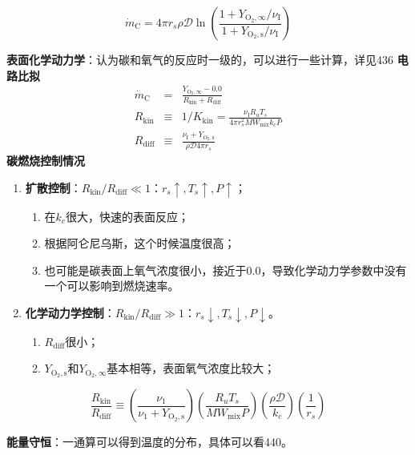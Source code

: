 \begin{equation}
    \dot{m}_\mathrm{C} = 4\pi r_s \rho \mathcal{D} \ln\left(\frac{1+Y_\mathrm{O_2,\infty}/\nu_\mathrm{I}}{1+Y_\mathrm{O_2,s}/\nu_\mathrm{I}}\right)
\end{equation}

\textbf{表面化学动力学}：认为碳和氧气的反应时一级的，可以进行一些计算，详见436
\textbf{电路比拟}
\begin{eqnarray}
    \dot{m}_\mathrm{C} &=& \frac{Y_\mathrm{O_2,\infty}-0.0}{R_\mathrm{kin}+R_\mathrm{diff}}\\
    R_\mathrm{kin} &\equiv& 1/K_\mathrm{kin} = \frac{\nu_\mathrm{I}R_u T_s}{4\pi r_s^2 MW_\mathrm{mix}k_c P}\\
    R_\mathrm{diff} &\equiv& \frac{\nu_\mathrm{I}+Y_\mathrm{O_2, s}}{\rho \mathcal{D}4\pi r_s}
\end{eqnarray}
\textbf{碳燃烧控制情况}

\begin{enumerate}
    \item \textbf{扩散控制}：\(R_\mathrm{kin}/R_\mathrm{diff}\ll1\)：\(r_s\uparrow, T_s\uparrow, P\uparrow\)；
    \begin{enumerate}
        \item 在\(k_c\)很大，快速的表面反应；
        \item 根据阿仑尼乌斯，这个时候温度很高；
        \item 也可能是碳表面上氧气浓度很小，接近于0.0，导致化学动力学参数中没有一个可以影响到燃烧速率。
    \end{enumerate}
    \item \textbf{化学动力学控制}：\(R_\mathrm{kin}/R_\mathrm{diff}\gg1\)：\(r_s\downarrow, T_s\downarrow, P\downarrow\)。
    \begin{enumerate}
        \item \(R_\mathrm{diff}\)很小；
        \item \(Y_\mathrm{O_2,s}\)和\(Y_\mathrm{O_2,\infty}\)基本相等，表面氧气浓度比较大；
    \end{enumerate}
\end{enumerate}
\begin{equation}
    {\frac{R_{\mathrm{kin}}}{R_{\mathrm{diff}}}}\equiv\left({\frac{\nu_{1}}{\nu_{1}+Y_\mathrm{O_{2},s}}}\right)\left({\frac{R_{u}T_{s}}{M W_{\mathrm{mix}}P}}\right)\left({\frac{\rho \mathcal{D}}{k_{c}}}\right)\left({\frac{1}{r_{s}}}\right)
\end{equation}

\textbf{能量守恒}：一通算可以得到温度的分布，具体可以看440。

